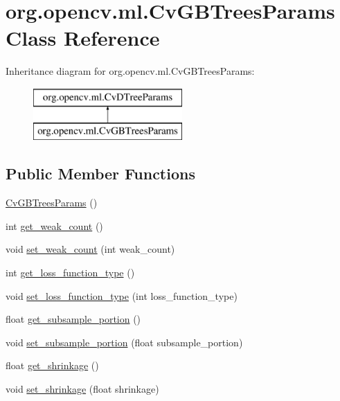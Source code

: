 \hypertarget{classorg_1_1opencv_1_1ml_1_1_cv_g_b_trees_params}{}\section{org.\+opencv.\+ml.\+Cv\+G\+B\+Trees\+Params Class Reference}
\label{classorg_1_1opencv_1_1ml_1_1_cv_g_b_trees_params}
Inheritance diagram for org.\+opencv.\+ml.\+Cv\+G\+B\+Trees\+Params\+:\begin{figure}[H]
\begin{center}
\leavevmode
\includegraphics[height=2.000000cm]{classorg_1_1opencv_1_1ml_1_1_cv_g_b_trees_params}
\end{center}
\end{figure}
\subsection*{Public Member Functions}
\begin{DoxyCompactItemize}
\item 
\mbox{\hyperlink{classorg_1_1opencv_1_1ml_1_1_cv_g_b_trees_params_a6322c0c66b392664076255036cecca37}{Cv\+G\+B\+Trees\+Params}} ()
\item 
int \mbox{\hyperlink{classorg_1_1opencv_1_1ml_1_1_cv_g_b_trees_params_ad5ef66e04fea3b027f8780fbed64cfe6}{get\+\_\+weak\+\_\+count}} ()
\item 
void \mbox{\hyperlink{classorg_1_1opencv_1_1ml_1_1_cv_g_b_trees_params_a9c8636507d06f54e1e03ffecfd7cc62d}{set\+\_\+weak\+\_\+count}} (int weak\+\_\+count)
\item 
int \mbox{\hyperlink{classorg_1_1opencv_1_1ml_1_1_cv_g_b_trees_params_a3c9fe177b40d63b8a1e5c8c4c84083f9}{get\+\_\+loss\+\_\+function\+\_\+type}} ()
\item 
void \mbox{\hyperlink{classorg_1_1opencv_1_1ml_1_1_cv_g_b_trees_params_ad724b62f5b3397df44856589e734c31d}{set\+\_\+loss\+\_\+function\+\_\+type}} (int loss\+\_\+function\+\_\+type)
\item 
float \mbox{\hyperlink{classorg_1_1opencv_1_1ml_1_1_cv_g_b_trees_params_a571c8c6a30847f32a147c715b5805aea}{get\+\_\+subsample\+\_\+portion}} ()
\item 
void \mbox{\hyperlink{classorg_1_1opencv_1_1ml_1_1_cv_g_b_trees_params_ae15182d898ddeba56788dd7332ab293d}{set\+\_\+subsample\+\_\+portion}} (float subsample\+\_\+portion)
\item 
float \mbox{\hyperlink{classorg_1_1opencv_1_1ml_1_1_cv_g_b_trees_params_a0676dfe63e08c54cc4ffd02c00367566}{get\+\_\+shrinkage}} ()
\item 
void \mbox{\hyperlink{classorg_1_1opencv_1_1ml_1_1_cv_g_b_trees_params_a51af964f656aeedc0431dabf35b6b67e}{set\+\_\+shrinkage}} (float shrinkage)
\end{DoxyCompactItemize}
